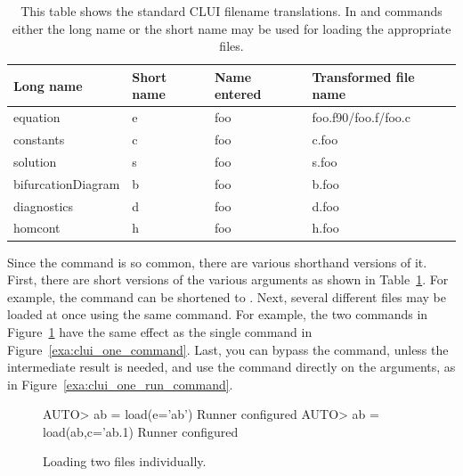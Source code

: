 \documentclass[12pt]{report}
\begin{document}
 \begin{table}[htbp]
 \begin{center}
 \begin{tabular}{| l | l | l | l |}
 \hline
 Long name & Short name & Name entered & Transformed file name \\
 \hline
 equation  & e          & foo          &foo.f90/foo.f/foo.c \\
 \hline
 constants  & c          & foo          & c.foo \\
 \hline
 solution  & s          & foo          & s.foo \\
 \hline
 bifurcationDiagram  & b          & foo          &b.foo \\
 \hline
 diagnostics  & d          & foo          &d.foo \\
 \hline
 homcont  & h          & foo          &h.foo \\
 \hline
 \end{tabular}
 \caption[Standard \AUTO CLUI filename translations.]
 {This table shows the standard \AUTO CLUI filename
 translations.  In  and 
 commands either the long name or the short name may be
 used for loading the appropriate files.}
 \label{tbl:clui_filename_translation}
 \end{center}
 \end{table}

 Since the  command is so common, there are
 various shorthand versions of it.  First, there are short versions
 of the various arguments as shown in Table~\ref{tbl:clui_filename_translation}.
 For example, the command  can 
 be shortened to .
 Next, several different
 files may be loaded at once using the same  command.
 For example, the two commands in Figure~\ref{exa:clui_two_command}
 have the same effect as the single command in 
 Figure~\ref{exa:clui_one_command}.
 Last, you can bypass the  command, unless the
 intermediate result is needed, and use the  command
 directly on the  arguments, as in
 Figure~\ref{exa:clui_one_run_command}.

 \begin{figure}[htbp]
 {\small \begin{center} \begin{boxedverbatim}
 AUTO> ab = load(e='ab')
 Runner configured
 AUTO> ab = load(ab,c='ab.1)
 Runner configured
 \end{boxedverbatim}
 \end{center} 
 }
 \caption[Loading two files individually]
 {Loading two files individually.}
 \label{exa:clui_two_command}
 \end{figure}
\end{document}
